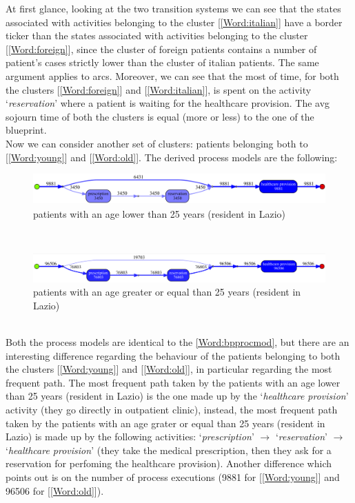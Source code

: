 At first glance, looking at the two transition systems we can see that the states associated with activities belonging to the cluster [\ref{Word:italian}] have a border ticker than the states associated with activities belonging to the cluster [\ref{Word:foreign}], since the cluster of foreign patients contains a number of
patient's cases strictly lower than the cluster of italian patients. The same argument applies to arcs. Moreover, we can see that the most of time, for both the clusters [\ref{Word:foreign}] and [\ref{Word:italian}], is spent on the activity `\textit{reservation}' where a patient is waiting for the healthcare provision. %
The avg sojourn time of both the clusters is equal (more or less) to the one of the blueprint.\\
Now we can consider another set of clusters: patients belonging both to [\ref{Word:young}] and [\ref{Word:old}]. The derived process models are the following:
\begin{figure} [htbp]
\includegraphics[width=\textwidth]{AmbulatoriInductiveVisualMinerYoungs}
\caption{patients with an age lower than 25 years (resident in Lazio)}
\end{figure}\\
\begin{figure} [htbp]
\includegraphics[width=\textwidth]{AmbulatoriInductiveVisualMinerOlds}
\caption{patients with an age greater or equal than 25 years (resident in Lazio)}
\end{figure}\\
Both the process models are identical to the \ref{Word:bpprocmod}, but there are an interesting difference regarding the behaviour of the patients belonging to both the clusters [\ref{Word:young}] and [\ref{Word:old}], in particular regarding the most frequent path. The most frequent path taken by the patients with an age lower than 25 years (resident in Lazio) is the one made up by the `\textit{healthcare provision}' activity (they go directly in outpatient clinic), instead, the most frequent path taken by the patients with an age grater or equal than 25 years (resident in Lazio) is made up by the following activities: `\textit{prescription}' $ \rightarrow $ `\textit{reservation}' $ \rightarrow$ `\textit{healthcare provision}' (they take the medical prescription, then they ask for a reservation for perfoming the healthcare provision). Another difference which points out is on the number of process executions (9881 for [\ref{Word:young}] and 96506 for [\ref{Word:old}]).
